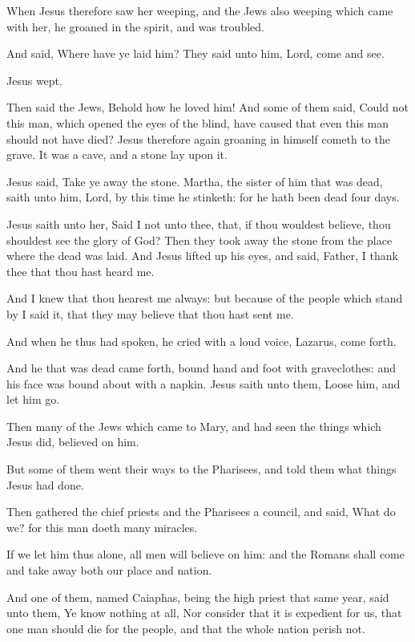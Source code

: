 \verse When Jesus therefore saw her weeping, and the Jews also weeping which came with her, he groaned in the spirit, and was troubled.

\verse And said, Where have ye laid him? They said unto him, Lord, come and see.

\verse Jesus wept.

\verse Then said the Jews, Behold how he loved him!  \verse And some of them said, Could not this man, which opened the eyes of the blind, have caused that even this man should not have died?  \verse Jesus therefore again groaning in himself cometh to the grave. It was a cave, and a stone lay upon it.

\verse Jesus said, Take ye away the stone. Martha, the sister of him that was dead, saith unto him, Lord, by this time he stinketh: for he hath been dead four days.

\verse Jesus saith unto her, Said I not unto thee, that, if thou wouldest believe, thou shouldest see the glory of God?  \verse Then they took away the stone from the place where the dead was laid. And Jesus lifted up his eyes, and said, Father, I thank thee that thou hast heard me.

\verse And I knew that thou hearest me always: but because of the people which stand by I said it, that they may believe that thou hast sent me.

\verse And when he thus had spoken, he cried with a loud voice, Lazarus, come forth.

\verse And he that was dead came forth, bound hand and foot with graveclothes: and his face was bound about with a napkin. Jesus saith unto them, Loose him, and let him go.

\verse Then many of the Jews which came to Mary, and had seen the things which Jesus did, believed on him.

\verse But some of them went their ways to the Pharisees, and told them what things Jesus had done.

\verse Then gathered the chief priests and the Pharisees a council, and said, What do we? for this man doeth many miracles.

\verse If we let him thus alone, all men will believe on him: and the Romans shall come and take away both our place and nation.

\verse And one of them, named Caiaphas, being the high priest that same year, said unto them, Ye know nothing at all, \verse Nor consider that it is expedient for us, that one man should die for the people, and that the whole nation perish not.

